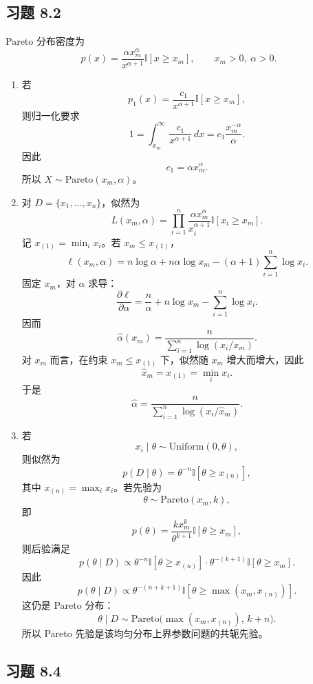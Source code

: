 \documentclass[UTF8,a4paper,12pt]{ctexart}
\newcommand{\ind}{\mathbb{I}}
\begin{document}
\subsection*{习题 8.2}

Pareto 分布密度为
\[
    p(x)=\frac{\alpha x_m^\alpha}{x^{\alpha+1}}\ind[x\ge x_m],
    \qquad x_m>0,\ \alpha>0.
\]

\begin{enumerate}
  \item 若
  \[
      p_1(x)=\frac{c_1}{x^{\alpha+1}}\ind[x\ge x_m],
  \]
  则归一化要求
  \[
      1=\int_{x_m}^{\infty}\frac{c_1}{x^{\alpha+1}}\,dx
      =c_1\frac{x_m^{-\alpha}}{\alpha}.
  \]
  因此
  \[
      c_1=\alpha x_m^\alpha.
  \]
  所以 $X\sim\mathrm{Pareto}(x_m,\alpha)$。

  \item 对 $D=\{x_1,\ldots,x_n\}$，似然为
  \[
      L(x_m,\alpha)
      =\prod_{i=1}^n
      \frac{\alpha x_m^\alpha}{x_i^{\alpha+1}}\ind[x_i\ge x_m].
  \]
  记 $x_{(1)}=\min_i x_i$。若 $x_m\le x_{(1)}$，
  \[
      \ell(x_m,\alpha)
      =n\log\alpha+n\alpha\log x_m-(\alpha+1)\sum_{i=1}^n\log x_i.
  \]
  固定 $x_m$，对 $\alpha$ 求导：
  \[
      \frac{\partial\ell}{\partial\alpha}
      =\frac{n}{\alpha}+n\log x_m-\sum_{i=1}^n\log x_i.
  \]
  因而
  \[
      \hat\alpha(x_m)
      =
      \frac{n}{\sum_{i=1}^n\log(x_i/x_m)}.
  \]
  对 $x_m$ 而言，在约束 $x_m\le x_{(1)}$ 下，似然随 $x_m$ 增大而增大，因此
  \[
      \hat x_m=x_{(1)}=\min_i x_i.
  \]
  于是
  \[
      \hat\alpha
      =
      \frac{n}{\sum_{i=1}^n\log(x_i/\hat x_m)}.
  \]

  \item 若
  \[
      x_i\mid \theta\sim \mathrm{Uniform}(0,\theta),
  \]
  则似然为
  \[
      p(D\mid \theta)=\theta^{-n}\ind[\theta\ge x_{(n)}],
  \]
  其中 $x_{(n)}=\max_i x_i$。若先验为
  \[
      \theta\sim\mathrm{Pareto}(x_m,k),
  \]
  即
  \[
      p(\theta)=\frac{kx_m^k}{\theta^{k+1}}\ind[\theta\ge x_m],
  \]
  则后验满足
  \[
      p(\theta\mid D)
      \propto
      \theta^{-n}\ind[\theta\ge x_{(n)}]\cdot
      \theta^{-(k+1)}\ind[\theta\ge x_m].
  \]
  因此
  \[
      p(\theta\mid D)
      \propto
      \theta^{-(n+k+1)}
      \ind[\theta\ge \max(x_m,x_{(n)})].
  \]
  这仍是 Pareto 分布：
  \[
      \theta\mid D\sim
      \mathrm{Pareto}\bigl(\max(x_m,x_{(n)}),\,k+n\bigr).
  \]
  所以 Pareto 先验是该均匀分布上界参数问题的共轭先验。
\end{enumerate}

\subsection*{习题 8.4}
\end{document}
